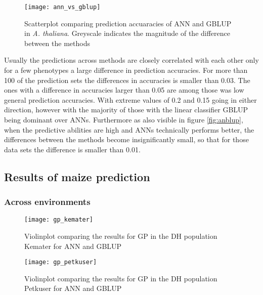 \begin{figure}[H]
  \centering
  \texttt{[image: ann\_vs\_gblup]}
  \decoRule
  \caption[Scatterplot comparing prediction accuaracies of ANN and GBLUP in
  \textit{A. thaliana}]{Scatterplot comparing prediction accuaracies of ANN and GBLUP in
    \textit{A. thaliana}. Greyscale indicates the magnitude of the difference between the
    methods}
\label{fig:annblup}
\end{figure}

Usually the predictions across methods are closely correlated with each other only for a
few phenotypes a large difference in prediction accuracies. For more than 100 of the
prediction sets the differences in accuracies is smaller than 0.03. The ones with a
difference in accuracies larger than 0.05 are among those was low general prediction
accuracies. With extreme values of 0.2 and 0.15 going in either direction, however with
the majority of those with the linear classifier GBLUP being dominant over
ANNs. Furthermore as also visible in figure \ref{fig:anblup}, when the predictive
abilities are high and ANNs technically performs better, the differences between the
methods become insignificantly small, so that for those data sets the difference is
smaller than 0.01.


\subsection{Results of maize prediction}
\subsubsection{Across environments}

\begin{figure}[H]
 \centering \texttt{[image: gp\_kemater]}
 \decoRule
 \caption[Violinplot comparing the results for GP in the DH population Kemater for ANN and
 GBLUP]{Violinplot comparing the results for GP in the DH population Kemater for ANN and
   GBLUP }
\label{fig:ke_ann}
\end{figure}

\begin{figure}[H]
 \centering \texttt{[image: gp\_petkuser]}
 \decoRule
 \caption[Violinplot comparing the results for GP in the DH population Petkuser for ANN and GBLUP]{Violinplot comparing the results for GP in the DH population Petkuser for ANN and GBLUP }
\label{fig:pe_ann}
\end{figure}

